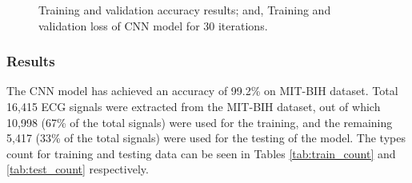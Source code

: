 \begin{figure}%
	\centering
	
	\hspace{8pt}%
	\caption[A set of four subfigures.]{
		 Training and validation accuracy results; and,
		 Training and validation loss of CNN model for 30 iterations.}%
	\label{fig:acc_val}%
\end{figure}


\subsubsection{Results}
The CNN model has achieved an accuracy of 99.2\% on MIT-BIH dataset. Total 16,415 ECG signals were extracted from the MIT-BIH dataset, out of which 10,998 (67\% of the total signals) were used for the training, and the remaining 5,417 (33\% of the total signals) were used for the testing of the model. The types count for training and testing data can be seen in Tables \ref{tab:train_count} and \ref{tab:test_count} respectively. 

